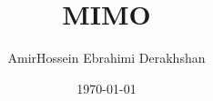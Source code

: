 \documentclass{beamer}
\title{MIMO}
\author{AmirHossein Ebrahimi Derakhshan}
\institute{University of Tabriz}
\date{\today}
\begin{document}
\begin{frame}
\titlepage
\end{frame}
\end{document}
